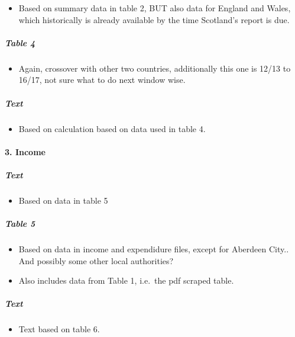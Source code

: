 \documentclass[]{article}
\providecommand{\tightlist}{%
  \setlength{\itemsep}{0pt}\setlength{\parskip}{0pt}}
\let\oldparagraph\paragraph
\renewcommand{\paragraph}[1]{\oldparagraph{#1}\mbox{}}
\let\oldsubparagraph\subparagraph
\renewcommand{\subparagraph}[1]{\oldsubparagraph{#1}\mbox{}}
\begin{document}
\begin{itemize}
\tightlist
\item
  Based on summary data in table 2, BUT also data for England and Wales,
  which historically is already available by the time Scotland's report
  is due.
\end{itemize}

\hypertarget{table-4}{%
\subparagraph{Table 4}\label{table-4}}

\begin{itemize}
\tightlist
\item
  Again, crossover with other two countries, additionally this one is
  12/13 to 16/17, not sure what to do next window wise.
\end{itemize}

\hypertarget{text-3}{%
\subparagraph{Text}\label{text-3}}

\begin{itemize}
\tightlist
\item
  Based on calculation based on data used in table 4.
\end{itemize}

\hypertarget{income}{%
\paragraph{3. Income}\label{income}}

\hypertarget{text-4}{%
\subparagraph{Text}\label{text-4}}

\begin{itemize}
\tightlist
\item
  Based on data in table 5
\end{itemize}

\hypertarget{table-5}{%
\subparagraph{Table 5}\label{table-5}}

\begin{itemize}
\tightlist
\item
  Based on data in income and expendidure files, except for Aberdeen
  City.. And possibly some other local authorities?
\item
  Also includes data from Table 1, i.e.~the pdf scraped table.
\end{itemize}

\hypertarget{text-5}{%
\subparagraph{Text}\label{text-5}}

\begin{itemize}
\tightlist
\item
  Text based on table 6.
\end{itemize}
\end{document}
